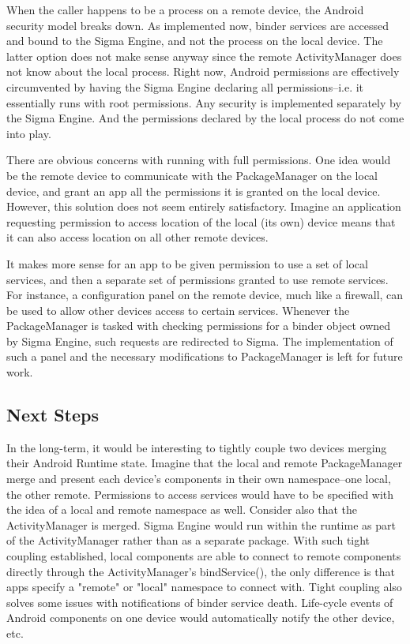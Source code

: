 \documentclass[prodmode]{acmlarge}
\begin{document}
When the caller happens to be a process on a remote device, the Android security model breaks down. As implemented now, binder services are accessed and bound to the Sigma Engine, and not the process on the local device. The latter option does not make sense anyway since the remote ActivityManager does not know about the local process. Right now, Android permissions are effectively circumvented by having the Sigma Engine declaring all permissions--i.e. it essentially runs with root permissions. Any security is implemented separately by the Sigma Engine. And the permissions declared by the local process do not come into play.

There are obvious concerns with running with full permissions. One idea would be the remote device to communicate with the PackageManager on the local device, and grant an app all the permissions it is granted on the local device. However, this solution does not seem entirely satisfactory. Imagine an application requesting permission to access location of the local (its own) device means that it can also access location on all other remote devices.

It makes more sense for an app to be given permission to use a set of local services, and then a separate set of permissions granted to use remote services. For instance, a configuration panel on the remote device, much like a firewall, can be used to allow other devices access to certain services. Whenever the PackageManager is tasked with checking permissions for a binder object owned by Sigma Engine, such requests are redirected to Sigma. The implementation of such a panel and the necessary modifications to PackageManager is left for future work.

\subsection{Next Steps}
\label{sec:NextSteps}
In the long-term, it would be interesting to tightly couple two devices merging their Android Runtime state. Imagine that the local and remote PackageManager merge and present each device's components in their own namespace--one local, the other remote. Permissions to access services would have to be specified with the idea of a local and remote namespace as well. Consider also that the ActivityManager is merged. Sigma Engine would run within the runtime as part of the ActivityManager rather than as a separate package. With such tight coupling established, local components are able to connect to remote components directly through the ActivityManager's bindService(), the only difference is that apps specify a "remote" or "local" namespace to connect with. Tight coupling also solves some issues with notifications of binder service death. Life-cycle events of Android components on one device would automatically notify the other device, etc.
\end{document}
